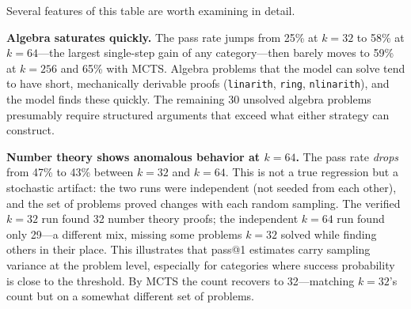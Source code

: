\documentclass[openany, amssymb, psamsfonts]{amsart}
\theoremstyle{definition}
\numberwithin{equation}{section}
\begin{document}
\begin{table}[h]
\centering
\caption{Per-category results on miniF2F-test. Numbers in parentheses are
pass rates. The induction category (8 problems, stable at 3 proved by $k=64$
through MCTS) is omitted for brevity.}
\label{tab:categories}
\end{table}

Several features of this table are worth examining in detail.

\textbf{Algebra saturates quickly.}
The pass rate jumps from 25\% at $k=32$ to 58\% at $k=64$---the largest
single-step gain of any category---then barely moves to 59\% at $k=256$
and 65\% with MCTS.
Algebra problems that the model can solve tend to have short, mechanically
derivable proofs (\texttt{linarith}, \texttt{ring}, \texttt{nlinarith}),
and the model finds these quickly.
The remaining 30 unsolved algebra problems presumably require structured
arguments that exceed what either strategy can construct.

\textbf{Number theory shows anomalous behavior at $k=64$.}
The pass rate \emph{drops} from 47\% to 43\% between $k=32$ and $k=64$.
This is not a true regression but a stochastic artifact: the two runs
were independent (not seeded from each other), and the set of problems
proved changes with each random sampling.
The verified $k=32$ run found 32 number theory proofs; the independent
$k=64$ run found only 29---a different mix, missing some problems $k=32$
solved while finding others in their place.
This illustrates that pass@1 estimates carry sampling variance at the
problem level, especially for categories where success probability is
close to the threshold.
By MCTS the count recovers to 32---matching $k=32$'s count but on a
somewhat different set of problems.
\end{document}
